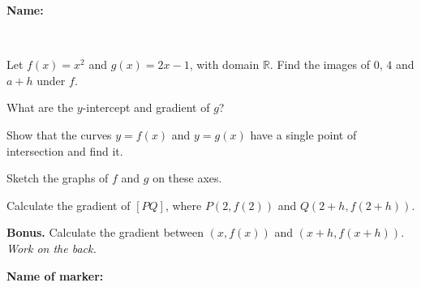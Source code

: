\documentclass[9pt]{exam}
\begin{document}
\textbf{Name:} \dotfill

\

\begin{questions}

\question[3] Let $f(x) = x^2$ and $g(x) = 2x - 1$, with domain $\mathbb{R}$. Find the images of $0$, $4$ and $a + h$ under $f$.
\fillwithdottedlines{20mm}

\question[2] What are the $y$-intercept and gradient of $g$?
\fillwithdottedlines{11mm}

\question[2] Show that the curves $y = f(x)$ and $y=g(x)$ have a single point of intersection and find it.
\fillwithdottedlines{30mm}

\question[2] Sketch the graphs of $f$ and $g$ on these axes.


\question[3] Calculate the gradient of $[PQ]$, where $P(2, f(2))$ and $Q(2+h, f(2+h)).$
\fillwithdottedlines{18mm}


\vfill

\question[0] \textbf{Bonus.} Calculate the gradient between $(x, f(x))$ and $(x+h, f(x+h))$. \hfill \emph{Work on the back.}

\end{questions}


\begin{tcolorbox}

\textbf{Name of marker:}

\begin{center}
\gradetable[h][questions]
\end{center}

\end{tcolorbox}
\end{document}
